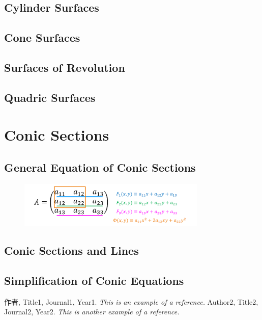 \documentclass[11pt]{../../TexTemplate/elegantbook} %
\begin{document}
\section{Cylinder Surfaces}

\section{Cone Surfaces}

\section{Surfaces of Revolution}

\section{Quadric Surfaces}

\chapter{Conic Sections}
\section{General Equation of Conic Sections}

\begin{figure}[h]
    \centering
    \includegraphics[width=0.8\textwidth]{img/ConicRelation.png}
\end{figure}

\section{Conic Sections and Lines}

\section{Simplification of Conic Equations}




\begin{thebibliography}{99} 
 作者, Title1, Journal1, Year1. \emph{ This is an example of a reference.}
 Author2, Title2, Journal2, Year2. \emph{ This is another example of a reference.}
\end{thebibliography}
\end{document}
